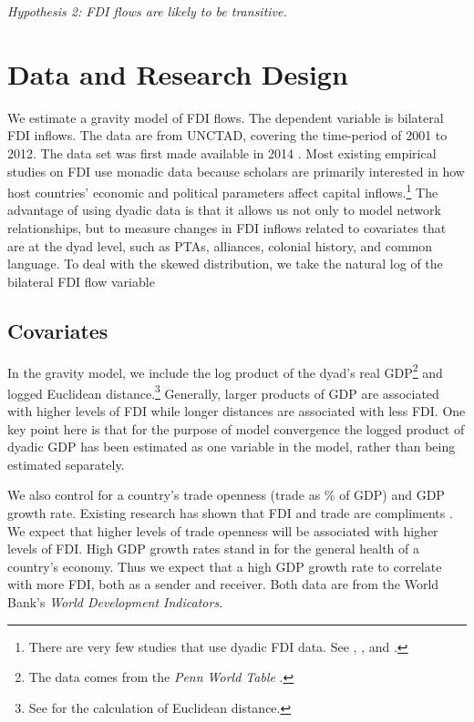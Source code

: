 \documentclass{article}
\begin{document}
\begin{center}
\textit{Hypothesis 2: FDI flows are likely to be transitive.}
\end{center}




\section{Data and Research Design}


We estimate a gravity model of FDI flows. The dependent variable is bilateral FDI inflows. The data are from UNCTAD, covering the time-period of 2001 to 2012. The data set was first made available in 2014 \citep{UNCTAD:2014}. Most existing empirical studies on FDI use monadic data because scholars are primarily interested in how host countries' economic and political parameters affect capital inflows.\footnote{There are very few studies that use dyadic FDI data. See \citet{Frenkel_et_al:2004}, \citet{Li_Vashchilko:2010}, and \citet{Razin_et_al:2005}. } The advantage of using dyadic data is that it allows us not only to model network relationships, but to measure changes in FDI inflows related to covariates that are at the dyad level, such as PTAs, alliances, colonial history, and common language. To deal with the skewed distribution, we take the natural log of the bilateral FDI flow variable

\subsection{Covariates}

In the gravity model, we include the log product of the dyad's real GDP\footnote{The data comes from the \textit{Penn World Table}  \citep{feenstra2015next}.} and logged Euclidean distance.\footnote{See \citet{mayer2011notes} for the calculation of Euclidean distance.} Generally, larger products of GDP are associated with higher levels of FDI while longer distances are associated with less FDI. One key point here is that for the purpose of model convergence the logged product of dyadic GDP has been estimated as one variable in the model, rather than being estimated separately.

We also control for a country's trade openness (trade as \% of GDP) and GDP growth rate. Existing research has shown that FDI and trade are compliments \citep{aizenman2006fdi}. We expect that higher levels of trade openness will be associated with higher levels of FDI. High GDP growth rates stand in for the general health of a country's economy. Thus we expect that a high GDP growth rate to correlate with more FDI, both as a sender and receiver. Both data are from the World Bank's \textit{World Development Indicators}.
\end{document}
